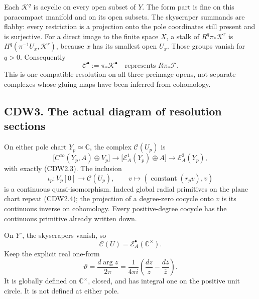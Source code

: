 Each \(\mathscr K^q\) is acyclic on every open subset of \(Y\). The form
part is fine on this paracompact manifold and on its open subsets. The
skyscraper summands are flabby: every restriction is a projection onto
the pole coordinates still present and is surjective. For a direct image
to the finite space \(X\), a stalk of \(R^q\pi_*\mathscr K^r\) is
\(H^q(\pi^{-1}U_x,\mathscr K^r)\), because \(x\) has its smallest open
\(U_x\). Those groups vanish for \(q>0\). Consequently \[
\boxed{\mathscr C^\bullet:=\pi_*\mathscr K^\bullet
\quad\text{represents }R\pi_*\mathscr F.}
\tag{CDW2.6}
\] This is one compatible resolution on all three preimage opens, not
separate complexes whose gluing maps have been inferred from cohomology.

\subsection{CDW3. The actual diagram of resolution
sections}\label{cdw3.-the-actual-diagram-of-resolution-sections}

On either pole chart \(Y_p\simeq\mathbb C\), the complex
\(\mathscr C(U_p)\) is \[
\bigl[C^\infty(Y_p,A)\oplus V_p\bigr]
\longrightarrow
\bigl[\mathscr E_A^1(Y_p)\oplus A\bigr]
\longrightarrow\mathscr E_A^2(Y_p),
\tag{CDW3.1}
\] with exactly (CDW2.3). The inclusion \[
\iota_p:V_p[0]\longrightarrow\mathscr C(U_p),\qquad
v\longmapsto(\operatorname{constant}(r_pv),v)
\tag{CDW3.2}
\] is a continuous quasi-isomorphism. Indeed global radial primitives on
the plane chart repeat (CDW2.4); the projection of a degree-zero cocycle
onto \(v\) is its continuous inverse on cohomology. Every
positive-degree cocycle has the continuous primitive already written
down.

On \(Y^\circ\), the skyscrapers vanish, so \[
\mathscr C(U)=\mathscr E_A^\bullet(\mathbb C^\times).
\tag{CDW3.3}
\] Keep the explicit real one-form \[
\vartheta=\frac{d\arg z}{2\pi}
=\frac1{4\pi i}\left(\frac{dz}{z}-\frac{d\overline z}{\overline z}\right).
\tag{CDW3.4}
\] It is globally defined on \(\mathbb C^\times\), closed, and has
integral one on the positive unit circle. It is not defined at either
pole.

